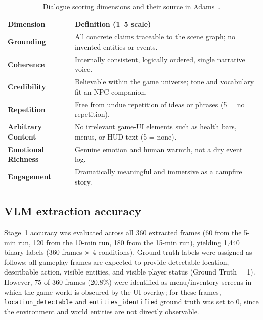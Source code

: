\documentclass[11pt]{article}
\begin{document}
\begin{table}[h]
\centering
\caption{Dialogue scoring dimensions and their source in Adams~\cite{Adams2014}.}
\label{tab:dimensions}
\begin{tabular}{>{\bfseries}lp{7.5cm}}
\toprule
Dimension & Definition (1--5 scale) \\
\midrule
Grounding         & All concrete claims traceable to the scene graph; no invented entities or events. \\
Coherence         & Internally consistent, logically ordered, single narrative voice. \\
Credibility       & Believable within the game universe; tone and vocabulary fit an NPC companion. \\
Repetition        & Free from undue repetition of ideas or phrases (5 = no repetition). \\
Arbitrary Content & No irrelevant game-UI elements such as health bars, menus, or HUD text (5 = none). \\
Emotional Richness & Genuine emotion and human warmth, not a dry event log. \\
Engagement        & Dramatically meaningful and immersive as a campfire story. \\
\bottomrule
\end{tabular}
\end{table}

\subsection{VLM extraction accuracy}

Stage~1 accuracy was evaluated across all 360 extracted frames (60 from the 5-min run, 120 from the 10-min run, 180 from the 15-min run), yielding 1{,}440 binary labels (360 frames $\times$ 4 conditions). Ground-truth labels were assigned as follows: all gameplay frames are expected to provide detectable location, describable action, visible entities, and visible player status (Ground Truth = 1). However, 75 of 360 frames (20.8\%) were identified as menu/inventory screens in which the game world is obscured by the UI overlay; for these frames, \texttt{location\_detectable} and \texttt{entities\_identified} ground truth was set to 0, since the environment and world entities are not directly observable.
\end{document}
